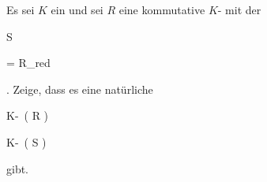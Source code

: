 {} {}



{}

{


Es sei $K$ ein
und sei $R$ eine kommutative
$K$-
mit der


\mavergleichskette

{\vergleichskette

{ S
}

{ = }{ R_{\rm red}
}

{  }{
}

{    }{
}

{   }{
}

}
{}{}{.}
Zeige, dass es eine natürliche


\mavergleichskettedisp

{\vergleichskette

{ K\!-\!\, \left(   R   \right)
}

{ \cong} { K\!-\!\, \left(   S   \right)
}

{ } {
}

{ } {
}

{ } {
}

}
{}{}{}
gibt.


}

{} {}



{}

